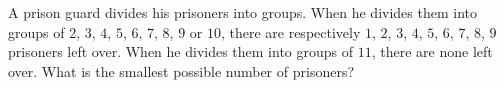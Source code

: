 A prison guard divides his prisoners into groups. When he divides them into groups of $2$, $3$, $4$, $5$, $6$, $7$, $8$, $9$ or $10$, there are respectively $1$, $2$, $3$, $4$, $5$, $6$, $7$, $8$, $9$ prisoners left over. When he divides them into groups of $11$, there are none left over. What is the smallest possible number of prisoners?
